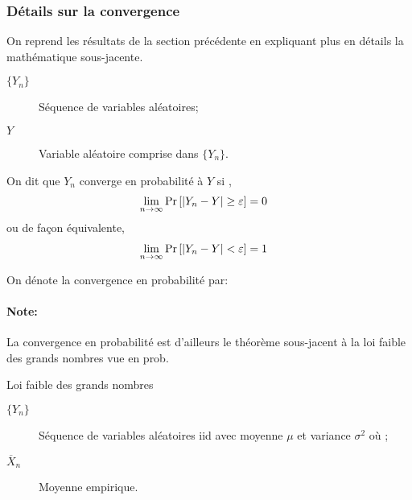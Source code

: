 \documentclass[10pt, french]{article}
\begin{document}
\begin{multicols*}{2}
\subsubsection*{Détails sur la convergence}
On reprend les résultats de la section précédente en expliquant plus en détails la mathématique sous-jacente.\\

\begin{definitionNOHFILLsub}
\begin{distributions}[Notation]
\begin{description}
	\item[$\{Y_{n}\}$]	Séquence de variables aléatoires;
	\item[$Y$]	Variable aléatoire comprise dans $\{Y_{n}\}$.
\end{description}
\end{distributions}

On dit que $Y_{n}$ converge en probabilité à $Y$ si , 
\begin{align*}
	\underset{n \rightarrow \infty}{\lim} \Pr\left[|Y_{n}	-	Y|	\geq	\varepsilon\right]	
	&=	0
\end{align*}
ou de façon équivalente,
\begin{align*}
	\underset{n \rightarrow \infty}{\lim} \Pr\left[|Y_{n}	-	Y|<	\varepsilon\right]	
	&=	1
\end{align*}

On dénote la convergence en probabilité par: 
\end{definitionNOHFILLsub}

\paragraph{Note:}	La convergence en probabilité est d'ailleurs le théorème sous-jacent à la loi faible des grands nombres vue en prob.

\begin{rappel}{Loi faible des grands nombres}
\begin{distributions}[Notation]
\begin{description}
	\item[$\{Y_{n}\}$]	Séquence de variables aléatoires iid avec moyenne $\mu$ et variance $\sigma^{2}$ où ;
	\item[$\overline{X}_{n}$]	Moyenne empirique.
\end{description}
\end{distributions}


\end{rappel}
\end{multicols*}
\end{document}
